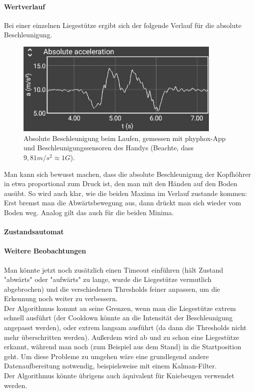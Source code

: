 \documentclass[a4paper,12pt]{article}
\begin{document}
\paragraph{Wertverlauf}
Bei einer einzelnen Liegestütze ergibt sich der folgende Verlauf für die absolute Beschleunigung.\\
\begin{figure}[ht]
	\centering
\includegraphics[width = 10cm]{bilder/pushup_sample.jpg}
	\caption{Absolute Beschleunigung beim Laufen, gemessen mit phyphox-App und Beschleunigungssensoren des Handys (Beachte, dass $9,81 m/s^2 \approx 1 G$).}
\end{figure} 
Man kann sich bewusst machen, dass die absolute Beschleunigung der Kopfhöhrer in etwa proportional zum Druck ist, den man mit den Händen auf den Boden ausübt. So wird auch klar, wie die beiden Maxima im Verlauf zustande kommen: Erst bremst man die Abwärtsbewegung aus, dann drückt man sich wieder vom Boden weg. Analog gilt das auch für die beiden Minima. 
\paragraph{Zustandsautomat}


\paragraph{Weitere Beobachtungen}
Man könnte jetzt noch zusätzlich einen Timeout einführen (hält Zustand "abwärts" oder "aufwärts" zu lange, wurde die Liegestütze vermutlich abgebrochen) und die verschiedenen Thresholds feiner anpassen, um die Erkennung noch weiter zu verbessern.\\
Der Algorithmus kommt an seine Grenzen, wenn man die Liegestütze extrem schnell ausführt (der Cooldown könnte an die Intensität der Beschleunigung angepasst werden), oder extrem langsam ausführt (da dann die Thresholds nicht mehr überschritten werden). Außerdem wird ab und zu schon eine Liegestütze erkannt, während man noch (zum Beispiel aus dem Stand) in die Startposition geht. Um diese Probleme zu umgehen wäre eine grundlegend andere Datenaufbereitung notwendig, beispielsweise mit einem Kalman-Filter.\\
Der Algorithmus könnte übrigens auch äquivalent für Kniebeugen verwendet werden.
\end{document}
